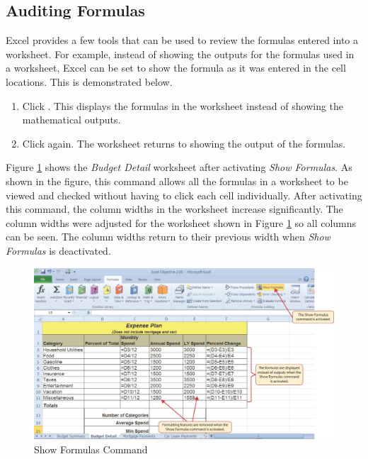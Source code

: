 \subsection{Auditing Formulas}

Excel provides a few tools that can be used to review the formulas entered into a worksheet. For example, instead of showing the outputs for the formulas used in a worksheet, Excel can be set to show the formula as it was entered in the cell locations. This is demonstrated below.

\begin{enumerate}
	\item Click . This displays the formulas in the worksheet instead of showing the mathematical outputs.
	\item Click  again. The worksheet returns to showing the output of the formulas.
\end{enumerate}

Figure \ref{02:fig08} shows the \textit{Budget Detail} worksheet after activating \textit{Show Formulas}. As shown in the figure, this command allows all the formulas in a worksheet to be viewed and checked without having to click each cell individually. After activating this command, the column widths in the worksheet increase significantly. The column widths were adjusted for the worksheet shown in Figure \ref{02:fig08} so all columns can be seen. The column widths return to their previous width when \textit{Show Formulas} is deactivated.

\begin{figure}[H]
	\centering
	\includegraphics[width=\maxwidth{.95\linewidth}]{gfx/ch02_fig08}
	\caption{Show Formulas Command}
	\label{02:fig08}
\end{figure}

